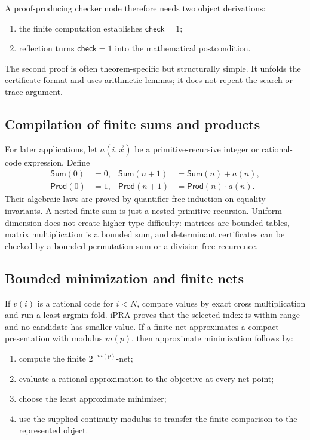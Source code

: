 A proof-producing checker node therefore needs two object derivations:

\begin{enumerate}
\item the finite computation establishes \(\mathsf{check}=1\);
\item reflection turns \(\mathsf{check}=1\) into the mathematical postcondition.
\end{enumerate}

The second proof is often theorem-specific but structurally simple.  It unfolds the certificate format and uses arithmetic lemmas; it does not repeat the search or trace argument.

\subsection{Compilation of finite sums and products}

For later applications, let \(a(i,\vec{x})\) be a primitive-recursive integer or rational-code expression.  Define
\begin{align*}
 \mathsf{Sum}(0)&=0,&
 \mathsf{Sum}(n+1)&=\mathsf{Sum}(n)+a(n),\\
 \mathsf{Prod}(0)&=1,&
 \mathsf{Prod}(n+1)&=\mathsf{Prod}(n)\cdot a(n).
\end{align*}
Their algebraic laws are proved by quantifier-free induction on equality invariants.  A nested finite sum is just a nested primitive recursion.  Uniform dimension does not create higher-type difficulty: matrices are bounded tables, matrix multiplication is a bounded sum, and determinant certificates can be checked by a bounded permutation sum or a division-free recurrence.

\subsection{Bounded minimization and finite nets}

If \(v(i)\) is a rational code for \(i<N\), compare values by exact cross multiplication and run a least-argmin fold.  iPRA proves that the selected index is within range and no candidate has smaller value.  If a finite net approximates a compact presentation with modulus \(m(p)\), then approximate minimization follows by:

\begin{enumerate}
\item compute the finite \(2^{-m(p)}\)-net;
\item evaluate a rational approximation to the objective at every net point;
\item choose the least approximate minimizer;
\item use the supplied continuity modulus to transfer the finite comparison to the represented object.
\end{enumerate}


